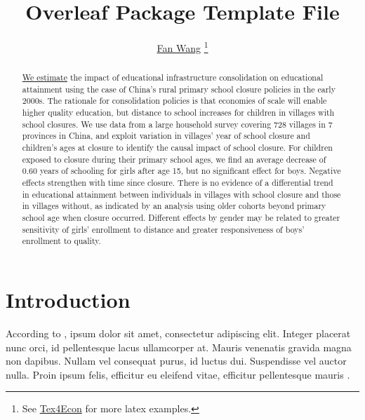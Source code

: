 \documentclass[12pt,english]{article}
\begin{document}
\title{Overleaf Package Template File}

\author{\href{http://fanwangecon.github.io/}{Fan Wang} \thanks{See \href{https://fanwangecon.github.io/Tex4Econ/}{Tex4Econ} for more latex examples.}}


\maketitle
\begin{abstract}
\singlespacing \href{https://papers.ssrn.com/sol3/papers.cfm?abstract_id=3140132}{We estimate} the impact of educational infrastructure consolidation on educational attainment using the case of China’s rural primary school closure policies in the early 2000s. The rationale for consolidation policies is that economies of scale will enable higher quality education, but distance to school increases for children in villages with school closures. We use data from a large household survey covering 728 villages in 7 provinces in China, and exploit variation in villages’ year of school closure and children’s ages at closure to identify the causal impact of school closure. For children exposed to closure during their primary school ages, we find an average decrease of 0.60 years of schooling for girls after age 15, but no significant effect for boys. Negative effects strengthen with time since closure. There is no evidence of a differential trend in educational attainment between individuals in villages with school closure and those in villages without, as indicated by an analysis using older cohorts beyond primary school age when closure occurred. Different effects by gender may be related to greater sensitivity of girls’ enrollment to distance and greater responsiveness of boys’ enrollment to quality.\end{abstract}
\vfill
\pagebreak{}

\section{Introduction}

According to \textcite{becker_human_1986}, ipsum dolor sit amet, consectetur adipiscing elit. Integer placerat nunc orci, id pellentesque lacus ullamcorper at. Mauris venenatis gravida magna non dapibus. Nullam vel consequat purus, id luctus dui. Suspendisse vel auctor nulla. Proin ipsum felis, efficitur eu eleifend vitae, efficitur pellentesque mauris \autocite{case_lasting_2005, conti_understanding_2010}.
\end{document}
